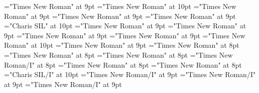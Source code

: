 \documentclass[gps1,twoside]{article}
\begin{document}
\font\spancomplexformtypespansubentrysubentriesentrysubentriesdiventryletData="Times New Roman" at 9pt
\font\spanenspancomplexformtypespansubentrysubentriesentrysubentriesdiventryletData="Times New Roman" at 10pt
\font\pronunciationssubentrysubentriesentryaftersubentrysubentriesentrysubentriesdiventryletData="Times New Roman" at 9pt
\font\pronunciationspansubentrysubentriesentrysubentriesdiventryletData="Times New Roman" at 9pt
\font\spanpronunciationspansubentrysubentriesentrysubentriesdiventryletData="Times New Roman" at 9pt
\font\spanbzhfonipaspanpronunciationspansubentrysubentriesentrysubentriesdiventryletData="Charis SIL" at 10pt
\font\sensessubentrysubentriesentryaftersubentrysubentriesentrysubentriesdiventryletData="Times New Roman" at 9pt
\font\spanspansubentrysubentriesentrysubentriesdiventryletData="Times New Roman" at 9pt
\font\sensespanspansubentrysubentriesentrysubentriesdiventryletData="Times New Roman" at 9pt
\font\spansensespanspansubentrysubentriesentrysubentriesdiventryletData="Times New Roman" at 9pt
\font\spanenspansensespanspansubentrysubentriesentrysubentriesdiventryletData="Times New Roman" at 10pt
\font\examplessensesensesentryaftersensespanspansubentrysubentriesentrysubentriesdiventryletData="Times New Roman" at 9pt
\font\examplespansensespanspansubentrysubentriesentrysubentriesdiventryletData="Times New Roman" at 8pt
\font\examplebeforespansensespanspansubentrysubentriesentrysubentriesdiventryletData="Times New Roman" at 8pt
\font\exampleafterspansensespanspansubentrysubentriesentrysubentriesdiventryletData="Times New Roman" at 8pt
\font\exampleexamplespansensespanspansubentrysubentriesentrysubentriesdiventryletData="Times New Roman/I" at 8pt
\font\examplebeforeexamplespansensespanspansubentrysubentriesentrysubentriesdiventryletData="Times New Roman" at 8pt
\font\exampleafterexamplespansensespanspansubentrysubentriesentrysubentriesdiventryletData="Times New Roman" at 8pt
\font\spanbzhexampleexamplespansensespanspansubentrysubentriesentrysubentriesdiventryletData="Charis SIL/I" at 10pt
\font\spanexampleexampleexamplessensesensessensesensessubentrysubentriesentryexamplespansensespanspansubentrysubentriesentrysubentriesdiventryletData="Times New Roman/I" at 9pt
\font\translationspanexampleexampleexamplessensesensessensesensessubentrysubentriesentryexamplespansensespanspansubentrysubentriesentrysubentriesdiventryletData="Times New Roman/I" at 9pt
\font\translationafterspanexampleexampleexamplessensesensessensesensessubentrysubentriesentryexamplespansensespanspansubentrysubentriesentrysubentriesdiventryletData="Times New Roman/I" at 9pt
\end{document}
